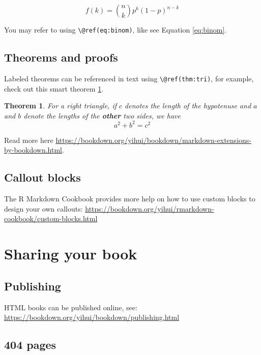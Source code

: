 \documentclass[
]{book}
\newtheorem{theorem}{Theorem}[chapter]
\theoremstyle{definition}
\theoremstyle{definition}
\theoremstyle{definition}
\theoremstyle{definition}
\theoremstyle{remark}
\begin{document}
\begin{equation} 
  f\left(k\right) = \binom{n}{k} p^k\left(1-p\right)^{n-k}
  \label{eq:binom}
\end{equation}

You may refer to using \texttt{\textbackslash{}@ref(eq:binom)}, like see Equation \eqref{eq:binom}.

\section{Theorems and proofs}\label{theorems-and-proofs}

Labeled theorems can be referenced in text using \texttt{\textbackslash{}@ref(thm:tri)}, for example, check out this smart theorem \ref{thm:tri}.

\begin{theorem}
\protect\hypertarget{thm:tri}{}\label{thm:tri}For a right triangle, if \(c\) denotes the \emph{length} of the hypotenuse
and \(a\) and \(b\) denote the lengths of the \textbf{other} two sides, we have
\[a^2 + b^2 = c^2\]
\end{theorem}

Read more here \url{https://bookdown.org/yihui/bookdown/markdown-extensions-by-bookdown.html}.

\section{Callout blocks}\label{callout-blocks}

The R Markdown Cookbook provides more help on how to use custom blocks to design your own callouts: \url{https://bookdown.org/yihui/rmarkdown-cookbook/custom-blocks.html}

\chapter{Sharing your book}\label{sharing-your-book}

\section{Publishing}\label{publishing}

HTML books can be published online, see: \url{https://bookdown.org/yihui/bookdown/publishing.html}

\section{404 pages}\label{pages}
\end{document}
